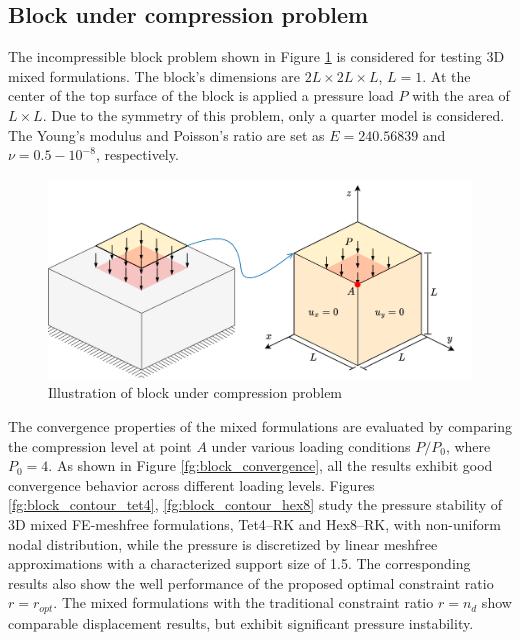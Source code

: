 \subsection{Block under compression problem}
The incompressible block problem \cite{reese2000} shown in Figure \ref{fg:block_model} is considered for testing 3D mixed formulations. The block's dimensions are $2L\times 2L \times L$, $L=1$.
At the center of the top surface of the block is applied a pressure load $P$ with the area of $L\times L$.
Due to the symmetry of this problem, only a quarter model is considered.
The Young's modulus and Poisson's ratio are set as $E = 240.56839$ and $\nu = 0.5-10^{-8}$, respectively.

\begin{figure}[H]
\centering
\includegraphics[width=\textwidth]{block_model_r1.png}
\caption{Illustration of block under compression problem}\label{fg:block_model}
\end{figure}

The convergence properties of the mixed formulations are evaluated by comparing the compression level at point $A$ under various loading conditions $P/P_0$, where $P_0 = 4$.
As shown in Figure \ref{fg:block_convergence}, all the results exhibit good convergence behavior across different loading levels.
Figures \ref{fg:block_contour_tet4}, \ref{fg:block_contour_hex8} study the pressure stability of 3D mixed FE-meshfree formulations, Tet4--RK and Hex8--RK, with non-uniform nodal distribution, while the pressure is discretized by linear meshfree approximations with a characterized support size of 1.5. The corresponding results also show the well performance of the proposed optimal constraint ratio $r=r_{opt}$. The mixed formulations with the traditional constraint ratio $r=n_d$ show comparable displacement results, but exhibit significant pressure instability.

